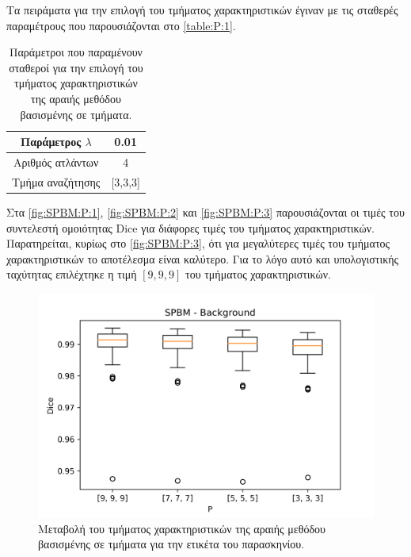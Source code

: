\documentclass[a4paper,12pt]{article}
\begin{document}
Τα πειράματα για την επιλογή του τμήματος χαρακτηριστικών έγιναν με τις σταθερές
παραμέτρους που παρουσιάζονται στο \autoref{table:P:1}.

\begin{table}[h!]
    \centering
    \begin{tabular}{|c|c|} 
        \hline
        Παράμετρος $\lambda$ & 0.01 \\ 
        \hline
        Αριθμός ατλάντων & 4 \\ 
        \hline
        Τμήμα αναζήτησης & [3,3,3] \\ 
        \hline
    \end{tabular}
    \caption{Παράμετροι που παραμένουν σταθεροί για την επιλογή του τμήματος
             χαρακτηριστικών της αραιής μεθόδου βασισμένης σε τμήματα.}
    \label{table:P:1}
\end{table}

Στα \autoref{fig:SPBM:P:1}, \autoref{fig:SPBM:P:2} και \autoref{fig:SPBM:P:3}
παρουσιάζονται οι τιμές του συντελεστή ομοιότητας Dice για διάφορες τιμές του
τμήματος χαρακτηριστικών. Παρατηρείται, κυρίως στο \autoref{fig:SPBM:P:3}, ότι
για μεγαλύτερες τιμές του τμήματος χαρακτηριστικών το αποτέλεσμα είναι καλύτερο.
Για το λόγο αυτό και υπολογιστικής ταχύτητας επιλέχτηκε η τιμή $[9,9,9]$ του
τμήματος χαρακτηριστικών.

\begin{figure}[H]
    \centering
    \includegraphics[width=0.85\linewidth]{SPBM_P_Background_plot.png}
    \caption{Μεταβολή του τμήματος χαρακτηριστικών της αραιής μεθόδου βασισμένης
             σε τμήματα για την ετικέτα του παρασκηνίου.}
    \label{fig:SPBM:P:1}
\end{figure}
\end{document}
